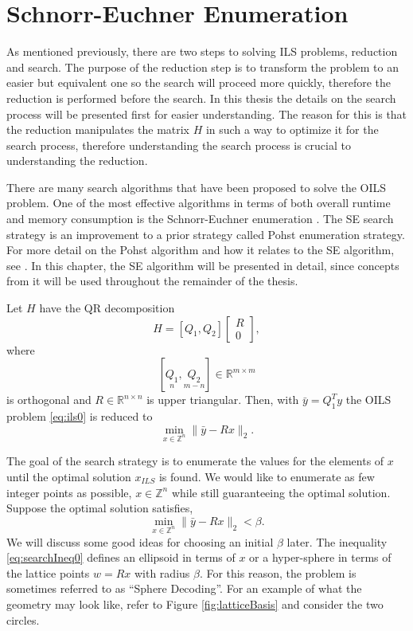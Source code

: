 \documentclass[12pt,Bold,letterpaper]{mcgilletdclass}
\newcommand{\bmx}{\begin{bmatrix}}
\newcommand{\emx}{\end{bmatrix}}
\newcommand{\be}{\begin{equation}}
\newcommand{\ee}{\end{equation}}
\newcommand{\by}{{\bar{y}}}
\begin{document}
\chapter{Schnorr-Euchner Enumeration} \label{chap:SESearch}

As mentioned previously, there are two steps to solving ILS problems, reduction and search. The purpose of the reduction step is to transform the problem to an easier but equivalent one so the search will proceed more quickly, therefore the reduction is performed before the search. In this thesis the details on the search process will be presented first for easier understanding. The reason for this is that the reduction manipulates the matrix $H$ in such a way to optimize it for the search process, therefore understanding the search process is crucial to understanding the reduction.

There are many search algorithms that have been proposed to solve the OILS problem. One of the most effective algorithms in terms of both overall runtime and memory consumption is the Schnorr-Euchner enumeration \cite{SchE94}. The SE search strategy is an improvement to a prior strategy called Pohst enumeration strategy. For more detail on the Pohst algorithm and how it relates to the SE algorithm, see \cite{AgrEVZ02}. In this chapter, the SE algorithm will be presented in detail, since concepts from it will be used throughout the remainder of the thesis.

Let $H$ have the QR decomposition
$$
H=[Q_1, Q_2] \bmx R \\ 0 \emx,
$$
where $$[\underset{n}{Q_1}, \underset{m-n}{Q_2}]  \in \mathbb{R}^{m\times m}$$ is orthogonal
and $R\in \mathbb{R}^{n\times n}$ is upper triangular. 
Then, with $\bar{y}=Q_1^Ty$ the OILS problem \eqref{eq:ils0} is reduced to 
\be 
\label{eq:ils}
\min_{x \in  {\mathbb{Z}^n}}  \| \by- Rx \|_2.
\ee

The goal of the search strategy is to enumerate the values for the elements of $x$ until the optimal solution $x_{\scriptscriptstyle{ILS}}$ is found. We would like to enumerate as few integer points as possible, $x \in \mathbb{Z}^n$ while still guaranteeing the optimal solution. Suppose the optimal solution satisfies,
\be 
\label{eq:searchIneq0}
\min_{x \in  {\mathbb{Z}^n}}  \| \by- Rx \|_2 < \beta. 
\ee
We will discuss some good ideas for choosing an initial $\beta$ later. The inequality \eqref{eq:searchIneq0} defines an ellipsoid in terms of $x$ or a hyper-sphere in terms of the lattice points $w=Rx$ with radius $\beta$. For this reason, the problem is sometimes referred to as ``Sphere Decoding''. For an example of what the geometry may look like, refer to Figure \ref{fig:latticeBasis} and consider the two circles.
\end{document}
